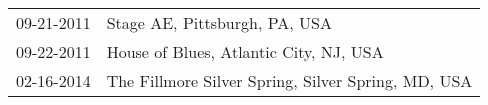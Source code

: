 \begin{supertabular}{ll}
 09-21-2011 &                       Stage AE, Pittsburgh, PA, USA \\
 09-22-2011 &              House of Blues, Atlantic City, NJ, USA \\
 02-16-2014 &  The Fillmore Silver Spring, Silver Spring, MD, USA \\
\end{supertabular}
